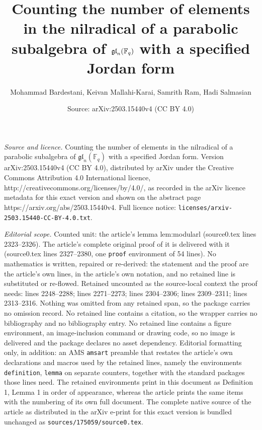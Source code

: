 \documentclass[10pt,a4paper]{amsart}
\title{Counting the number of elements in the nilradical of a parabolic subalgebra of $\gl_n(\mathbb F_q)$ with a specified Jordan form}
\author{Mohammad Bardestani, Keivan Mallahi-Karai, Samrith Ram, Hadi Salmasian}
\date{Source: arXiv:2503.15440v4 (CC BY 4.0)}
\newcommand{\gl}{\mathfrak{gl}}
\begin{document}
\maketitle

\noindent\emph{Source and licence.} Counting the number of elements in the nilradical of a parabolic subalgebra of $\gl_n(\mathbb F_q)$ with a specified Jordan form. Version arXiv:2503.15440v4 (CC BY 4.0), distributed by arXiv under the Creative Commons Attribution 4.0 International licence, http://creativecommons.org/licenses/by/4.0/, as recorded in the arXiv licence metadata for this exact version and shown on the abstract page https://arxiv.org/abs/2503.15440v4. Full licence notice: \texttt{licenses/arxiv-2503.15440-CC-BY-4.0.txt}.\par\smallskip

\noindent\textit{Editorial scope.} Counted unit: the article's lemma lem:modularl (source0.tex lines 2323--2326). The article's complete original proof of it is delivered with it (source0.tex lines 2327--2380, one \texttt{proof} environment of 54 lines). No mathematics is written, repaired or re-derived: the statement and the proof are the article's own lines, in the article's own notation, and no retained line is substituted or re-flowed.  Retained uncounted as the source-local context the proof needs: lines 2248--2288; lines 2271--2273; lines 2304--2306; lines 2309--2311; lines 2313--2316.  Nothing was omitted from any retained span, so the package carries no omission record.  No retained line contains a citation, so the wrapper carries no bibliography and no bibliography entry.  No retained line contains a figure environment, an image-inclusion command or drawing code, so no image is delivered and the package declares no asset dependency.  Editorial formatting only, in addition: an AMS \texttt{amsart} preamble that restates the article's own declarations and macros used by the retained lines, namely the environments \texttt{definition}, \texttt{lemma} on separate counters, together with the standard packages those lines need.  The retained environments print in this document as Definition 1, Lemma 1 in order of appearance, whereas the article prints the same items with the numbering of its own full document.  The complete native source of the article as distributed in the arXiv e-print for this exact version is bundled unchanged as \texttt{sources/175059/source0.tex}.
\end{document}
